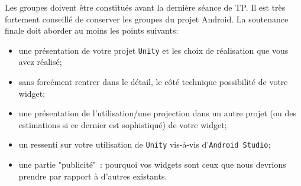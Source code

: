 \documentclass[a4paper,10pt]{article}
\begin{document}
Les groupes doivent être constitués avant la dernière séance de TP. Il est très fortement conseillé de conserver les groupes du projet Android. La soutenance finale doit aborder au moins les points suivants:
\begin{itemize}
	\item une présentation de votre projet \texttt{Unity} et les choix de réalisation que vous avez réalisé;
	\item sans forcément rentrer dans le détail, le côté technique possibilité de votre widget;
	\item une présentation de l'utilisation/une projection dans un autre projet (ou des estimations si ce dernier est sophistiqué) de votre widget;
	\item un ressenti sur votre utilisation de \texttt{Unity} vis-à-vis d'\texttt{Android Studio};
	\item une partie "publicité"~: pourquoi vos widgets sont ceux que nous devrions prendre par rapport à d'autres existants.
\end{itemize}
\end{document}
